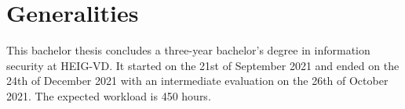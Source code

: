 ﻿\documentclass[../report.tex]{subfiles}
\begin{document}
\section{Generalities}
This bachelor thesis concludes a three-year bachelor’s degree in information security at HEIG-VD.
It started on the 21st of September 2021 and ended on the 24th of December 2021 with an intermediate evaluation on the 26th of October 2021. The expected workload is 450 hours.
\end{document}
